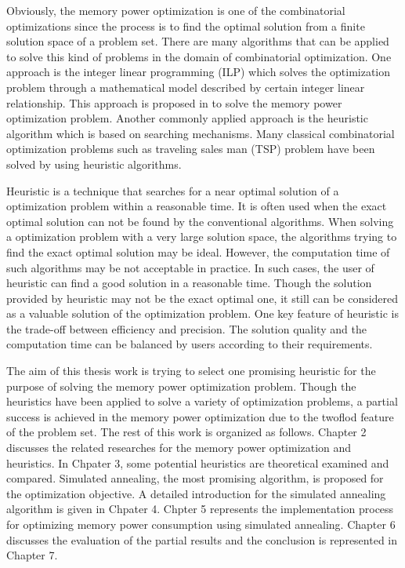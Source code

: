 	Obviously, the memory power optimization is one of the combinatorial optimizations since the process
	is to find the optimal solution from a finite solution space of a problem set. There are many algorithms
	that can be applied to solve this kind of problems in the domain of combinatorial optimization.
	One approach is the integer linear programming (ILP) which solves the optimization problem through a 
	mathematical model described by certain integer linear relationship. This approach is proposed in
	\cite{Strobel2016} to solve the memory power optimization problem. Another commonly applied approach is the
	heuristic algorithm which is based on searching mechanisms. Many classical combinatorial optimization
	problems such as traveling sales man (TSP) problem have been solved by using heuristic algorithms.
	
	Heuristic is a technique that searches for a near optimal solution of a optimization problem within
	a reasonable time. It is often used when the exact optimal solution can not be found by the conventional
	algorithms. When solving a optimization problem with a very large solution space, the algorithms trying to
	find the exact optimal solution may be ideal. However, the computation time of such algorithms may be not
	acceptable in practice. In such cases, the user of heuristic can find a good solution in a reasonable
	time. Though the solution provided by heuristic may not be the exact optimal one, it still can be
	considered as a valuable solution of the optimization problem. One key feature of heuristic is the
	trade-off between efficiency and precision. The solution quality and the computation time can be balanced by
	users according to their requirements.
	
	The aim of this thesis work is trying to select one promising heuristic for the purpose of solving the memory power optimization problem. Though the heuristics have been applied to solve a variety of optimization problems, a partial success is achieved in the
	memory power optimization due to the twoflod feature of the problem set. The rest of this work is organized as follows.
	Chapter 2 discusses the related researches for the memory power optimization and heuristics. In Chpater 3, some potential
	heuristics are theoretical examined and compared. Simulated annealing, the most promising algorithm, is proposed for the 
	optimization objective. A detailed introduction for the simulated annealing algorithm is given in Chpater 4. Chpter 5 represents
	the implementation process for optimizing memory power consumption using simulated annealing. Chapter 6 discusses the evaluation
	of the partial results and the conclusion is represented in Chapter 7.


